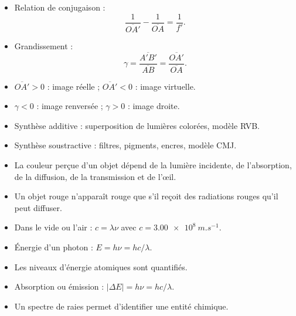 \documentclass[11pt,a4paper]{article}
\begin{document}
\begin{tcolorbox}[colframe=vertprepa,colback=green!4!white,title={2. Lentilles minces convergentes}]
\begin{itemize}[label=$\triangleright$]
  \item Relation de conjugaison :
  \[
  \frac{1}{\overline{OA'}}-\frac{1}{\overline{OA}}=\frac{1}{f'}.
  \]
  \item Grandissement :
  \[
  \gamma=\frac{\overline{A'B'}}{\overline{AB}}=\frac{\overline{OA'}}{\overline{OA}}.
  \]
  \item $\overline{OA'}>0$ : image réelle ; $\overline{OA'}<0$ : image virtuelle.
  \item $\gamma<0$ : image renversée ; $\gamma>0$ : image droite.
\end{itemize}
\end{tcolorbox}

\begin{tcolorbox}[colframe=orangeprepa,colback=orange!4!white,title={3. Couleurs}]
\begin{itemize}[label=$\triangleright$]
  \item Synthèse additive : superposition de lumières colorées, modèle RVB.
  \item Synthèse soustractive : filtres, pigments, encres, modèle CMJ.
  \item La couleur perçue d'un objet dépend de la lumière incidente, de l'absorption, de la diffusion, de la transmission et de l'œil.
  \item Un objet rouge n'apparaît rouge que s'il reçoit des radiations rouges qu'il peut diffuser.
\end{itemize}
\end{tcolorbox}

\begin{tcolorbox}[colframe=violetprepa,colback=violet!4!white,title={4. Lumière : modèles ondulatoire et particulaire}]
\begin{itemize}[label=$\triangleright$]
  \item Dans le vide ou l'air : $c=\lambda\nu$ avec $c=\SI{3.00e8}{m.s^{-1}}$.
  \item Énergie d'un photon : $E=h\nu=hc/\lambda$.
  \item Les niveaux d'énergie atomiques sont quantifiés.
  \item Absorption ou émission : $|\Delta E|=h\nu=hc/\lambda$.
  \item Un spectre de raies permet d'identifier une entité chimique.
\end{itemize}
\end{tcolorbox}
\end{document}
